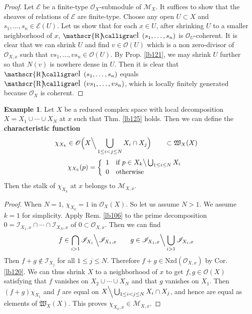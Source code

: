 \documentclass[12pt,b5paper,notitlepage]{report}
\theoremstyle{definition}
\newtheorem{eg}[df]{Example}
\theoremstyle{plain}
\DeclareMathOperator{\Rel}{\mathscr{R}\text{\kern -3pt {\calligra\large el}~}\,}
\newcommand{\fk}{\mathfrak}
\newcommand{\scr}{\mathscr}
\newcommand{\Nzd}{\mathrm{Nzd}}
\numberwithin{equation}{section}
\begin{document}
\begin{proof}
Let $\scr E$ be a finite-type $\scr O_X$-submodule of $\scr M_X$. It suffices to show that the sheaves of relations of $\scr E$ are finite-type. Choose any open $U\subset X$ and $s_1,\dots,s_n\in\scr E(U)$. Let us show that for each $x\in U$, after shrinking $U$ to a smaller neighborhood of $x$, $\Rel(s_1,\dots,s_n)$ is $\scr O_U$-coherent. It is clear that we can shrink $U$ and find $v\in\scr O(U)$ which is a non zero-divisor of $\scr O_{X,x}$ such that $vs_1,\dots,vs_n\in\scr O(U)$. By Prop. \ref{lb121}, we may shrink $U$ further so that $N(v)$ is nowhere dense in $U$. Then it is clear that $\Rel(s_1,\dots,s_n)$ equals $\Rel(vs_1,\dots,vs_n)$, which is locally finitely generated because $\scr O_X$ is coherent.
\end{proof}




\begin{eg}\label{lb213}
Let $X$ be a reduced complex space with local decomposition $X=X_1\cup\cdots\cup X_N$ at $x$ such that Thm. \ref{lb125} holds. Then we can define the \textbf{characteristic function} 
\begin{gather}
\begin{gathered}
\chi_{X_k}\in\scr O\Big(X\Big\backslash\bigcup_{1\leq i<j\leq N}X_i\cap X_j\Big)\qquad\subset \fk W_X(X)\\[0.5ex]
\chi_{X_k}(p)=\left\{\begin{array}{ll}
1 & \text{if }p\in X_k\big\backslash\bigcup_{1\leq i\leq N} X_i\\[0.5ex]
0 & \text{otherwise}
\end{array}\right.
\end{gathered}
\end{gather}
Then the stalk of $\chi_{X_k}$ at $x$ belongs to $\scr M_{X,x}$.
\end{eg}

\begin{proof}
When $N=1$, $\chi_{X_k}=1$ in $\scr O_X(X)$.  So let us assume $N>1$. We assume $k=1$ for simplicity. Apply Rem. \ref{lb106} to the prime decomposition $0=\scr I_{X_1,x}\cap\cdots\cap\scr I_{X_N,x}$ of $0\subset\scr O_{X,x}$. Then we can find
\begin{align*}
f\in\bigcap_{i>1}\scr I_{X_i}\Big\backslash\scr I_{X_1,x}\qquad g\in \scr I_{X_1,x}\Big\backslash\bigcup_{i>1}\scr I_{X_i,x}
\end{align*}
Then $f+g\notin \scr I_{X_j}$ for all $1\leq j\leq N$. Therefore $f+g\in\Nzd(\scr O_{X,x})$ by Cor. \ref{lb120}. We can thus shrink $X$ to a neighborhood of $x$ to get $f,g\in\scr O(X)$ satisfying that $f$ vanishes on $X_2\cup\cdots\cup X_N$ and that $g$ vanishes on $X_1$. Then $(f+g)\chi_{X_1}$ and $f$ are equal on $X\Big\backslash\bigcup_{1\leq i<j\leq N}X_i\cap X_j$, and hence are equal as elements of $\fk W_X(X)$. This proves $\chi_{X_k,x}\in\scr M_{X,x}$.
\end{proof}
\end{document}
